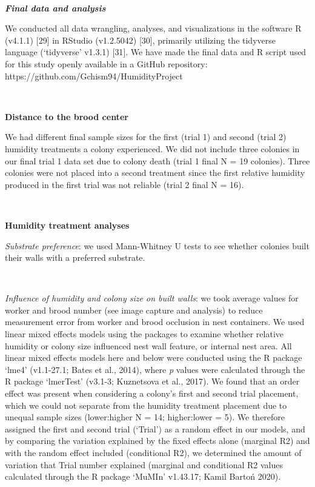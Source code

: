 \documentclass[3p]{elsarticle} %
\begin{document}
~

\textbf{\emph{Final data and analysis}}

We conducted all data wrangling, analyses, and visualizations in the
software R (v4.1.1) {[}29{]} in RStudio (v1.2.5042) {[}30{]}, primarily
utilizing the tidyverse language (`tidyverse' v1.3.1) {[}31{]}. We have
made the final data and R script used for this study openly available in
a GitHub repository: https://github.com/Gchism94/HumidityProject

~

\textbf{Distance to the brood center}

We had different final sample sizes for the first (trial 1) and second
(trial 2) humidity treatments a colony experienced. We did not include
three colonies in our final trial 1 data set due to colony death (trial
1 final N = 19 colonies). Three colonies were not placed into a second
treatment since the first relative humidity produced in the first trial
was not reliable (trial 2 final N = 16).

~

\textbf{Humidity treatment analyses}

\emph{Substrate preference}: we used Mann-Whitney U tests to see whether
colonies built their walls with a preferred substrate.

~

\emph{Influence of humidity and colony size on built walls}: we took
average values for worker and brood number (see image capture and
analysis) to reduce measurement error from worker and brood occlusion in
nest containers. We used linear mixed effects models using the packages
to examine whether relative humidity or colony size influenced nest wall
feature, or internal nest area. All linear mixed effects models here and
below were conducted using the R package `lme4' (v1.1-27.1; Bates et
al., 2014), where \emph{p} values were calculated through the R package
`lmerTest' (v3.1-3; Kuznetsova et al., 2017). We found that an order
effect was present when considering a colony's first and second trial
placement, which we could not separate from the humidity treatment
placement due to unequal sample sizes (lower:higher N = 14; higher:lower
= 5). We therefore assigned the first and second trial (`Trial') as a
random effect in our models, and by comparing the variation explained by
the fixed effects alone (marginal R2) and with the random effect
included (conditional R2), we determined the amount of variation that
Trial number explained (marginal and conditional R2 values calculated
through the R package `MuMIn' v1.43.17; Kamil Bartoń 2020).
\end{document}
